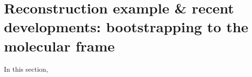 \section{Reconstruction example & recent developments: bootstrapping to the molecular frame}

In this section, 